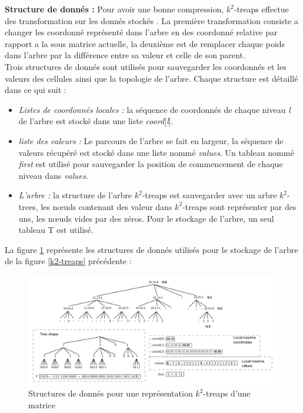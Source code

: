 \textbf{Structure de donnés :} Pour avoir une bonne compression, $k^2$-treaps effectue des transformation sur les donnés stockés . La première transformation consiste a changer les coordonné  représenté dans l'arbre en des coordonné relative par rapport a la sous matrice actuelle, la deuxième est de remplacer chaque poids dans l'arbre par la différence entre sa valeur et celle de son parent.\\
Trois structures de donnés sont utilisés pour sauvegarder les coordonnés et les valeurs des cellules ainsi que la topologie de l'arbre. Chaque structure est détaillé dans ce qui suit :
\begin{itemize}
\item \textit{Listes de coordonnés locales :} la séquence de coordonnés de chaque niveau \textit{l} de l'arbre est stocké dans une liste \textit{coord}[\textit{l}].
\item \textit{liste des valeurs : } Le parcours de l'arbre se fait en largeur, la séquence de valeurs récupéré est stocké dans une liste nommé \textit{values}. Un tableau nommé \textit{first} est utilisé pour sauvegarder la position de commencement de chaque niveau dans \textit{values}.
\item \textit{L'arbre :} la structure de l'arbre $k^2$-treaps est sauvegarder avec un arbre $k^2$-trees, les nœuds contenant des valeur dans $k^2$-treaps sont représenter par des uns, les nœuds vides par des zéros. Pour le stockage de l'arbre, un seul tableau T est utilisé. 
\end{itemize}

La figure \ref{k2-treaps-structure} représente les structures de donnés utilisés pour le stockage de l'arbre de la figure \ref{k2-treaps} précédente \citep{badr2013traitement} :

\begin{figure}[H]
\begin{center}
\includegraphics[height=200 pt, width=380 pt]{./ressources/image/k2-treaps-structure.png} 
\end{center}
\caption{Structures de donnés pour une représentation $k^2$-treaps d'une matrice}
\label{k2-treaps-structure}
\end{figure}

